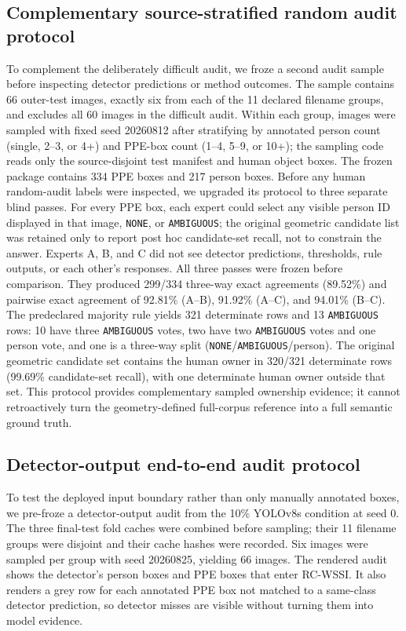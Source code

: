 \documentclass[iicol,pdflatex,sn-mathphys-num]{sn-jnl}
\begin{document}
\subsection{Complementary source-stratified random audit protocol}
To complement the deliberately difficult audit, we froze a second audit sample before inspecting detector predictions or method outcomes. The sample contains 66 outer-test images, exactly six from each of the 11 declared filename groups, and excludes all 60 images in the difficult audit. Within each group, images were sampled with fixed seed 20260812 after stratifying by annotated person count (single, 2--3, or 4+) and PPE-box count (1--4, 5--9, or 10+); the sampling code reads only the source-disjoint test manifest and human object boxes. The frozen package contains 334 PPE boxes and 217 person boxes. Before any human random-audit labels were inspected, we upgraded its protocol to three separate blind passes. For every PPE box, each expert could select any visible person ID displayed in that image, \texttt{NONE}, or \texttt{AMBIGUOUS}; the original geometric candidate list was retained only to report post hoc candidate-set recall, not to constrain the answer. Experts A, B, and C did not see detector predictions, thresholds, rule outputs, or each other's responses. All three passes were frozen before comparison. They produced 299/334 three-way exact agreements (89.52\%) and pairwise exact agreement of 92.81\% (A--B), 91.92\% (A--C), and 94.01\% (B--C). The predeclared majority rule yields 321 determinate rows and 13 \texttt{AMBIGUOUS} rows: 10 have three \texttt{AMBIGUOUS} votes, two have two \texttt{AMBIGUOUS} votes and one person vote, and one is a three-way split (\texttt{NONE}/\texttt{AMBIGUOUS}/person). The original geometric candidate set contains the human owner in 320/321 determinate rows (99.69\% candidate-set recall), with one determinate human owner outside that set. This protocol provides complementary sampled ownership evidence; it cannot retroactively turn the geometry-defined full-corpus reference into a full semantic ground truth.


\subsection{Detector-output end-to-end audit protocol}\label{sec:endtoendprotocol}
To test the deployed input boundary rather than only manually annotated boxes, we pre-froze a detector-output audit from the 10\% YOLOv8s condition at seed 0. The three final-test fold caches were combined before sampling; their 11 filename groups were disjoint and their cache hashes were recorded. Six images were sampled per group with seed 20260825, yielding 66 images. The rendered audit shows the detector's person boxes and PPE boxes that enter RC-WSSI. It also renders a grey row for each annotated PPE box not matched to a same-class detector prediction, so detector misses are visible without turning them into model evidence.
\end{document}
